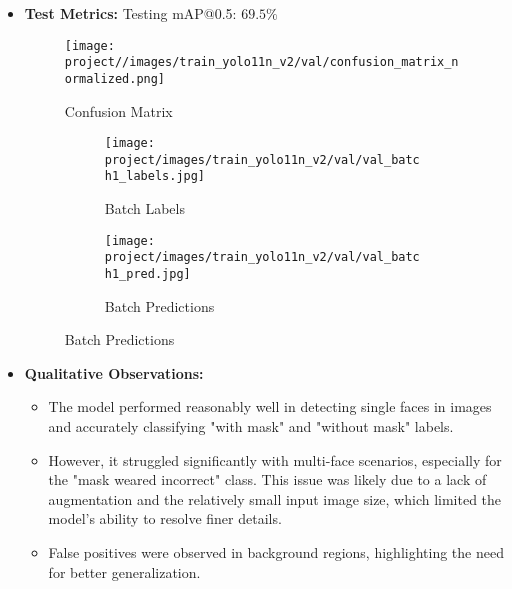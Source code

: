 \documentclass[11pt]{article}
\begin{document}
\begin{itemize}
    \item \textbf{Test Metrics:} Testing mAP@0.5: $69.5\%$

        \begin{figure}[H]
            \centering
            \caption{Confusion Matrix}
            \label{fig:enter-label}
            \texttt{[image: project//images/train\_yolo11n\_v2/val/confusion\_matrix\_normalized.png]} %
        \end{figure}

        \begin{figure}[H]
            \centering
            \caption{Comparison of Original and Labeled Images (Set 1)}
            \label{fig:set1}
            \begin{subfigure}[b]{0.48\textwidth} %
                \centering
                \caption{Batch Labels}
                \label{fig:input1}
                \texttt{[image: project/images/train\_yolo11n\_v2/val/val\_batch1\_labels.jpg]}
            \end{subfigure}
            \hspace{0.02\textwidth} %
            \begin{subfigure}[b]{0.48\textwidth} %
                \centering
                \caption{Batch Predictions}
                \label{fig:output1}
                \texttt{[image: project/images/train\_yolo11n\_v2/val/val\_batch1\_pred.jpg]}
            \end{subfigure}
        \end{figure}    

    \item \textbf{Qualitative Observations:}
        \begin{itemize}
            \item The model performed reasonably well in detecting single faces in images and accurately classifying "with mask" and "without mask" labels.
            \item However, it struggled significantly with multi-face scenarios, especially for the "mask weared incorrect" class. This issue was likely due to a lack of augmentation and the relatively small input image size, which limited the model’s ability to resolve finer details.
            \item False positives were observed in background regions, highlighting the need for better generalization.
        \end{itemize}
\end{itemize}
\end{document}
